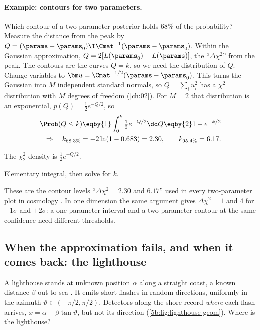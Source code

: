 \paragraph{Example: contours for two parameters.}
Which contour of a two-parameter posterior holds 68\% of the probability? Measure the
distance from the peak by $Q=(\params-\params_0)\T\Cmat^{-1}(\params-\params_0)$. Within
the Gaussian approximation, $Q=2[L(\params_0)-L(\params)]$, the ``$\Delta\chi^2$'' from
the peak. The contours are the curves $Q=k$, so we need the distribution of $Q$. Change
variables to $\bm u=\Cmat^{-1/2}(\params-\params_0)$. This turns the Gaussian into $M$
independent standard normals, so $Q=\sum_iu_i^2$ has a $\chi^2$ distribution with $M$
degrees of freedom (\cref{ch:02}). For $M=2$ that distribution is an exponential,
$p(Q)=\frac12e^{-Q/2}$, so
\begin{align*}
  \Prob(Q\le k)\eqby{1}\int_0^k\tfrac12e^{-Q/2}\dd Q\eqby{2}1-e^{-k/2}
  \\
  \Rightarrow\quad
  k_{68.3\%}=-2\ln(1-0.683)=2.30,\qquad k_{95.4\%}=6.17 .
\end{align*}
\begin{explain}
  \item The $\chi^2_2$ density is $\frac12e^{-Q/2}$.
  \item Elementary integral, then solve for $k$.
\end{explain}
These are the contour levels ``$\Delta\chi^2=2.30$ and $6.17$'' used in every
two-parameter plot in cosmology . In one dimension the same
argument gives $\Delta\chi^2=1$ and $4$ for $\pm1\sigma$ and $\pm2\sigma$: a one-parameter
interval and a two-parameter contour at the same confidence need different thresholds.

\subsection{When the approximation fails, and when it comes back: the lighthouse}

A lighthouse stands at unknown position $\alpha$ along a straight coast, a known
distance $\beta$ out to sea . It emits short flashes in random
directions, uniformly in the azimuth $\vartheta\in(-\pi/2,\pi/2)$. Detectors along the
shore record \emph{where} each flash arrives, $x=\alpha+\beta\tan\vartheta$, but not its
direction (\cref{5b:fig:lighthouse-geom}). Where is the lighthouse?


